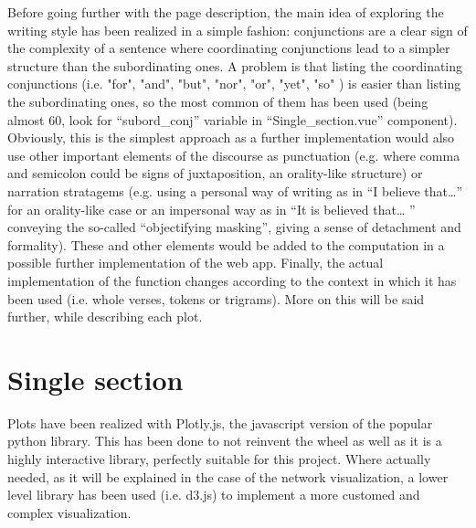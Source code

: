 \documentclass[sigchi]{article}
\begin{document}
Before going further with the page description, the main idea of exploring the writing style has been realized in a simple fashion: conjunctions are a clear sign of the complexity of a sentence where coordinating conjunctions lead to a simpler structure than the subordinating ones. A problem is that listing the coordinating conjunctions (i.e. "for", "and", "but", "nor", "or", "yet", "so" ) is easier than listing the subordinating ones, so the most common of them has been used (being almost 60, look for “subord\_conj” variable in  “Single\_section.vue” component). Obviously, this is the simplest approach as a further implementation would also use other important elements of the discourse as punctuation (e.g. where comma and semicolon could be signs of juxtaposition, an orality-like structure) or narration stratagems (e.g. using a personal way of writing as in “I believe that…” for an orality-like case or an impersonal way as in “It is believed that… ” conveying the so-called “objectifying masking”, giving a sense of detachment and formality). These and other elements would be added to the computation in a possible further implementation of the web app. Finally, the actual implementation of the function changes according to the context in which it has been used (i.e. whole verses, tokens or trigrams). More on this will be said further, while describing each plot.


\section{Single section}
Plots have been realized with Plotly.js, the javascript version of the popular python library. This has been done to not reinvent the wheel as well as it is a highly interactive library, perfectly suitable for this project. Where actually needed, as it will be explained in the case of the network visualization, a lower level library has been used (i.e. d3.js) to implement a more customed and complex visualization.
\end{document}
